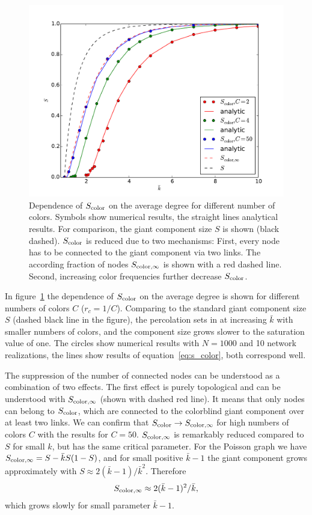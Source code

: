 \documentclass[aps, pre, onecolumn, a4paper, floatfix]{revtex4}
\begin{document}
\begin{figure}[htb]
\begin{center}
	\includegraphics[width=0.7\columnwidth]{S_color_k.pdf}
	\caption{Dependence of $S_{\rm color}$ on the average degree for different number of colors. 
	Symbols show numerical results, the straight lines analytical results. For comparison, 
	the giant component size $S$ is shown (black dashed). $S_{\rm color}$ is reduced due to two mechanisms: First, 
	every node has to be connected to the giant component via two links. The according fraction of 
	nodes $S_{{\rm color},\infty}$ is shown with a red dashed line. Second, increasing color frequencies 
	further decrease $S_{\rm color}$.}
	\label{fig:poisson}
\end{center}
\end{figure}

In figure~\ref{fig:poisson} the dependence of $S_{\rm color}$ on the average degree is shown for different numbers 
of colors $C$ ($r_c=1/C$). Comparing to the standard giant component size $S$ (dashed black line in the figure), 
the percolation sets in at increasing $\bar k$ with smaller numbers of colors, and the component size grows 
slower to the saturation value of one. The circles show numerical results with $N=1000$ and 10 network realizations, 
the lines show results of equation~\ref{eq:s_color}, both correspond well. 

The suppression of the number of connected nodes can be understood as a combination of two effects. 
The first effect is purely topological and can be understood with $S_{{\rm color},\infty}$ 
(shown with dashed red line). It means that only nodes can belong to $S_{\rm color}$, which are connected 
to the colorblind giant component over at least two links. We can confirm that 
$S_{\rm color}\to S_{{\rm color},\infty}$ for high numbers of colors $C$ with the results for $C=50$.
$S_{{\rm color},\infty}$ is remarkably reduced compared to $S$ for small $k$, but has the same critical parameter. 
For the Poisson graph we have $S_{\rm color,\infty}=S-{\bar k} S (1-S)$, and for small positive ${\bar k}-1$ 
the giant component grows approximately with $S\approx 2 ({\bar k}-1)/{\bar k}^2$. Therefore
\begin{align}
S_{\rm color,\infty}\approx 2({\bar k}-1)^2/\bar k,
\end{align}
which grows slowly for small parameter ${\bar k}-1$. 
\end{document}
